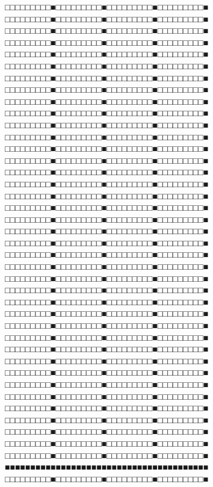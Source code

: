 \noindent
□□□□□□□□□■□□□□□□□□□■□□□□□□□□□■□□□□□□□□□■
□□□□□□□□□■□□□□□□□□□■□□□□□□□□□■□□□□□□□□□■
□□□□□□□□□■□□□□□□□□□■□□□□□□□□□■□□□□□□□□□■
□□□□□□□□□■□□□□□□□□□■□□□□□□□□□■□□□□□□□□□■
□□□□□□□□□■□□□□□□□□□■□□□□□□□□□■□□□□□□□□□■
□□□□□□□□□■□□□□□□□□□■□□□□□□□□□■□□□□□□□□□■
□□□□□□□□□■□□□□□□□□□■□□□□□□□□□■□□□□□□□□□■
□□□□□□□□□■□□□□□□□□□■□□□□□□□□□■□□□□□□□□□■
□□□□□□□□□■□□□□□□□□□■□□□□□□□□□■□□□□□□□□□■
□□□□□□□□□■□□□□□□□□□■□□□□□□□□□■□□□□□□□□□■
□□□□□□□□□■□□□□□□□□□■□□□□□□□□□■□□□□□□□□□■
□□□□□□□□□■□□□□□□□□□■□□□□□□□□□■□□□□□□□□□■
□□□□□□□□□■□□□□□□□□□■□□□□□□□□□■□□□□□□□□□■
□□□□□□□□□■□□□□□□□□□■□□□□□□□□□■□□□□□□□□□■
□□□□□□□□□■□□□□□□□□□■□□□□□□□□□■□□□□□□□□□■
□□□□□□□□□■□□□□□□□□□■□□□□□□□□□■□□□□□□□□□■
□□□□□□□□□■□□□□□□□□□■□□□□□□□□□■□□□□□□□□□■
□□□□□□□□□■□□□□□□□□□■□□□□□□□□□■□□□□□□□□□■
□□□□□□□□□■□□□□□□□□□■□□□□□□□□□■□□□□□□□□□■
□□□□□□□□□■□□□□□□□□□■□□□□□□□□□■□□□□□□□□□■
□□□□□□□□□■□□□□□□□□□■□□□□□□□□□■□□□□□□□□□■
□□□□□□□□□■□□□□□□□□□■□□□□□□□□□■□□□□□□□□□■
□□□□□□□□□■□□□□□□□□□■□□□□□□□□□■□□□□□□□□□■
□□□□□□□□□■□□□□□□□□□■□□□□□□□□□■□□□□□□□□□■
□□□□□□□□□■□□□□□□□□□■□□□□□□□□□■□□□□□□□□□■
□□□□□□□□□■□□□□□□□□□■□□□□□□□□□■□□□□□□□□□■
□□□□□□□□□■□□□□□□□□□■□□□□□□□□□■□□□□□□□□□■
□□□□□□□□□■□□□□□□□□□■□□□□□□□□□■□□□□□□□□□■
□□□□□□□□□■□□□□□□□□□■□□□□□□□□□■□□□□□□□□□■
□□□□□□□□□■□□□□□□□□□■□□□□□□□□□■□□□□□□□□□■
□□□□□□□□□■□□□□□□□□□■□□□□□□□□□■□□□□□□□□□■
□□□□□□□□□■□□□□□□□□□■□□□□□□□□□■□□□□□□□□□■
□□□□□□□□□■□□□□□□□□□■□□□□□□□□□■□□□□□□□□□■
□□□□□□□□□■□□□□□□□□□■□□□□□□□□□■□□□□□□□□□■
□□□□□□□□□■□□□□□□□□□■□□□□□□□□□■□□□□□□□□□■
□□□□□□□□□■□□□□□□□□□■□□□□□□□□□■□□□□□□□□□■
□□□□□□□□□■□□□□□□□□□■□□□□□□□□□■□□□□□□□□□■
□□□□□□□□□■□□□□□□□□□■□□□□□□□□□■□□□□□□□□□■
□□□□□□□□□■□□□□□□□□□■□□□□□□□□□■□□□□□□□□□■
■■■■■■■■■■■■■■■■■■■■■■■■■■■■■■■■■■■■■■■■
□□□□□□□□□■□□□□□□□□□■□□□□□□□□□■□□□□□□□□□■